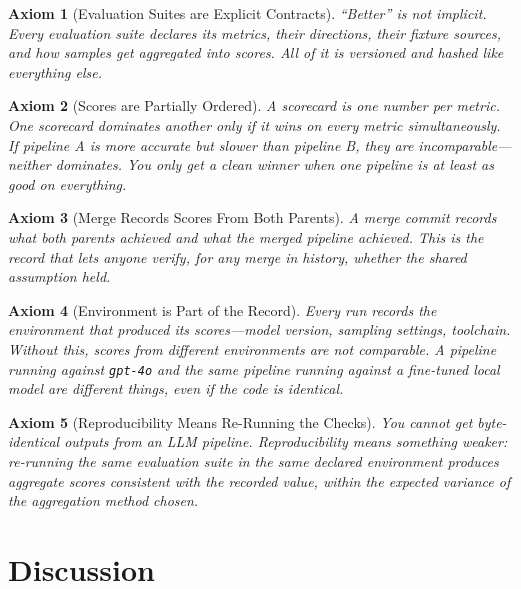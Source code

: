 \documentclass{article}
\newtheorem{axiom}{Axiom}
\begin{document}
\begin{axiom}[Evaluation Suites are Explicit Contracts]
``Better'' is not implicit. Every evaluation suite declares its metrics,
their directions, their fixture sources, and how samples get aggregated into
scores. All of it is versioned and hashed like everything else.
\end{axiom}

\begin{axiom}[Scores are Partially Ordered]
A scorecard is one number per metric. One scorecard dominates another only if
it wins on every metric simultaneously. If pipeline A is more accurate but
slower than pipeline B, they are incomparable---neither dominates. You only
get a clean winner when one pipeline is at least as good on everything.
\end{axiom}

\begin{axiom}[Merge Records Scores From Both Parents]
A merge commit records what both parents achieved and what the merged pipeline
achieved. This is the record that lets anyone verify, for any merge in history,
whether the shared assumption held.
\end{axiom}

\begin{axiom}[Environment is Part of the Record]
Every run records the environment that produced its scores---model version,
sampling settings, toolchain. Without this, scores from different environments
are not comparable. A pipeline running against \texttt{gpt-4o} and the same
pipeline running against a fine-tuned local model are different things, even
if the code is identical.
\end{axiom}

\begin{axiom}[Reproducibility Means Re-Running the Checks]
You cannot get byte-identical outputs from an LLM pipeline. Reproducibility
means something weaker: re-running the same evaluation suite in the same
declared environment produces aggregate scores consistent with the recorded
value, within the expected variance of the aggregation method chosen.
\end{axiom}

\section{Discussion}
\label{sec:discussion}
\end{document}

